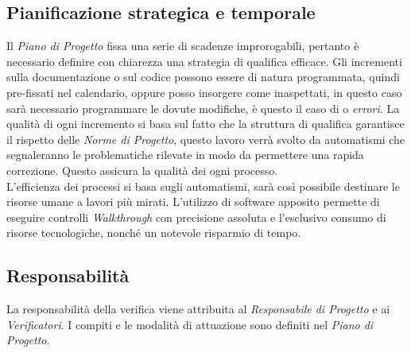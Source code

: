 	\subsection{Pianificazione strategica e temporale}
	Il \emph{Piano di Progetto} fissa una serie di scadenze improrogabili, pertanto è necessario definire con chiarezza una strategia di qualifica efficace. Gli incrementi sulla documentazione o sul codice possono essere di natura programmata, quindi pre-fissati nel calendario, oppure posso insorgere come inaspettati, in questo caso sarà necessario programmare le dovute modifiche, è questo il caso di  o \emph{errori}. La qualità di ogni incremento si basa sul fatto che la struttura di qualifica garantisce il rispetto delle \emph{Norme di Progetto}, questo lavoro verrà svolto da automatismi che segnaleranno le problematiche rilevate in modo da permettere una rapida correzione. Questo assicura la qualità dei ogni processo. \\
	L'efficienza dei processi si basa sugli automatismi, sarà così possibile destinare le risorse umane a lavori più mirati. L'utilizzo di software apposito permette di eseguire controlli \emph{Walkthrough} con precisione assoluta e l'esclusivo consumo di risorse tecnologiche, nonché un notevole risparmio di tempo.
	
	\subsection{Responsabilità}
	La responsabilità della verifica viene attribuita al \emph{Responsabile di Progetto} e ai \emph{Verificatori}. I compiti e le modalità di attuazione sono definiti nel \emph{Piano di Progetto}.
	
